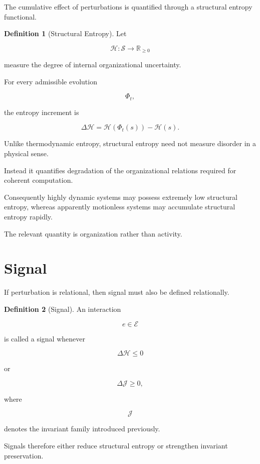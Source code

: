 \documentclass[11pt,oneside]{book}
\numberwithin{equation}{chapter}
\theoremstyle{definition}
\newtheorem{definition}{Definition}[chapter]
\theoremstyle{plain}
\begin{document}
The cumulative effect of perturbations is quantified through a structural
entropy functional.

\begin{definition}[Structural Entropy]

Let

\[
\mathcal{H}:
\mathcal{S}
\rightarrow
\mathbb{R}_{\ge0}
\]

measure the degree of internal organizational uncertainty.

For every admissible evolution

\[
\Phi_t,
\]

the entropy increment is

\[
\Delta\mathcal{H}
=
\mathcal{H}(\Phi_t(s))
-
\mathcal{H}(s).
\]

\end{definition}

Unlike thermodynamic entropy, structural entropy need not measure disorder in
a physical sense.

Instead it quantifies degradation of the organizational relations required
for coherent computation.

Consequently highly dynamic systems may possess extremely low structural
entropy, whereas apparently motionless systems may accumulate structural
entropy rapidly.

The relevant quantity is organization rather than activity.

\section{Signal}

If perturbation is relational, then signal must also be defined
relationally.

\begin{definition}[Signal]

An interaction

\[
e\in\mathcal{E}
\]

is called a signal whenever

\[
\Delta\mathcal{H}\le0
\]

or

\[
\Delta\mathcal{J}\ge0,
\]

where

\[
\mathcal{J}
\]

denotes the invariant family introduced previously.

Signals therefore either reduce structural entropy or strengthen invariant
preservation.

\end{definition}
\end{document}
